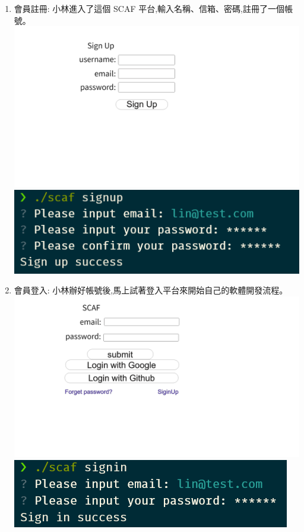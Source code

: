 \documentclass{report}
\begin{document}
\begin{enumerate}[label=(\Alph*)]
  \item 會員註冊: 小林進入了這個 SCAF 平台,輸入名稱、信箱、密碼,註冊了一個帳號。 \\
  \includegraphics[width=\textwidth]{assets/wireframe/sign_up.png}
  \includegraphics[width=\textwidth]{assets/wireframe/sign_up_CLI.png}
  \item 會員登入: 小林辦好帳號後,馬上試著登入平台來開始自己的軟體開發流程。 \\
  \includegraphics[width=\textwidth]{assets/wireframe/Login.png}
  \includegraphics[width=\textwidth]{assets/wireframe/Login_CLI.png}

\end{enumerate}
\end{document}
